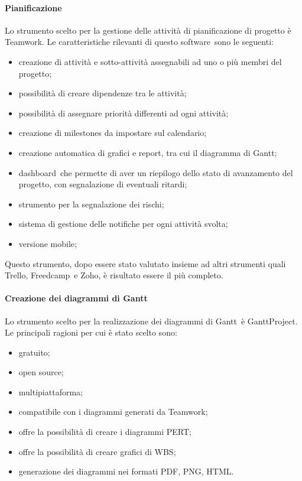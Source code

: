 \documentclass[../NormeProgetto.tex]{subfiles}
\begin{document}
			\paragraph{Pianificazione} \label{sec: Pianificazione Teamwork}
				Lo strumento scelto per la gestione delle attività di pianificazione di progetto è Teamwork\g. Le caratteristiche rilevanti di questo software\g\ sono le seguenti:
				\begin{itemize}
					\item creazione di attività e sotto-attività assegnabili ad uno o più membri del progetto;
					\item possibilità di creare dipendenze tra le attività;
					\item possibilità di assegnare priorità differenti ad ogni attività;
					\item creazione di milestones da impostare sul calendario;
					\item creazione automatica di grafici e report, tra cui il diagramma di Gantt;
					\item dashboard\g\ che permette di aver un riepilogo dello stato di avanzamento del progetto, con segnalazione di eventuali ritardi;
					\item strumento per la segnalazione dei rischi;
					\item sistema di gestione delle notifiche per ogni attività svolta;
					\item versione mobile;
				\end{itemize}		 
				Questo strumento, dopo essere stato valutato insieme ad altri strumenti quali Trello, Freedcamp\g\ e Zoho, è risultato essere il più completo.
			
			\paragraph{Creazione dei diagrammi di Gantt}
				Lo strumento scelto per la realizzazione dei diagrammi di Gantt\g\ è GanttProject. Le principali ragioni per cui è stato scelto sono:
				\begin{itemize}
					\item gratuito;
					\item open source\g;
					\item multipiattaforma;
					\item compatibile con i diagrammi generati da Teamwork\g;
					\item offre la possibilità di creare i diagrammi PERT\g;
					\item offre la possibilità di creare grafici di WBS\g;
					\item generazione dei diagrammi nei formati PDF\g, PNG\g, HTML\g.
				\end{itemize}
\end{document}
